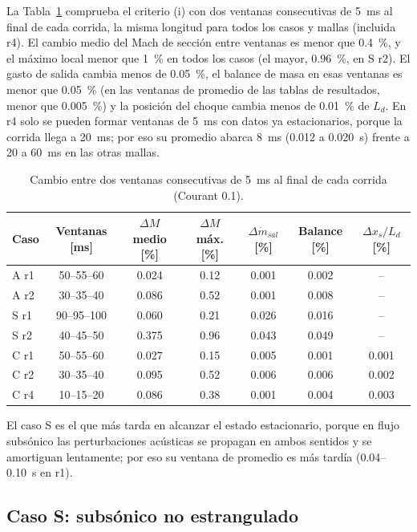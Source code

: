 \documentclass[12pt,letterpaper]{article}
\numberwithin{equation}{section}
\begin{document}
La Tabla~\ref{tab:ventanas-eq} comprueba el criterio (i) con dos ventanas consecutivas de 5~ms al final de cada corrida, la misma longitud para todos los casos y mallas (incluida r4). El cambio medio del Mach de sección entre ventanas es menor que 0.4~\%, y el máximo local menor que 1~\% en todos los casos (el mayor, 0.96~\%, en S r2). El gasto de salida cambia menos de 0.05~\%, el balance de masa en esas ventanas es menor que 0.05~\% (en las ventanas de promedio de las tablas de resultados, menor que 0.005~\%) y la posición del choque cambia menos de 0.01~\% de $L_d$. En r4 solo se pueden formar ventanas de 5~ms con datos ya estacionarios, porque la corrida llega a 20~ms; por eso su promedio abarca 8~ms (0.012 a 0.020~s) frente a 20 a 60~ms en las otras mallas.

\begin{table}[H]
\centering
\caption{Cambio entre dos ventanas consecutivas de 5~ms al final de cada corrida (Courant 0.1).}
\label{tab:ventanas-eq}
\small
\renewcommand{\arraystretch}{1.15}
\begin{tabular}{lcccccc}
\toprule
Caso & Ventanas [ms] & $\Delta M$ medio [\%] & $\Delta M$ máx. [\%] & $\Delta\dot m_{sal}$ [\%] & Balance [\%] & $\Delta x_s/L_d$ [\%] \\
\midrule
A r1 & 50--55--60 & 0.024 & 0.12 & 0.001 & 0.002 & -- \\
A r2 & 30--35--40 & 0.086 & 0.52 & 0.001 & 0.008 & -- \\
S r1 & 90--95--100 & 0.060 & 0.21 & 0.026 & 0.016 & -- \\
S r2 & 40--45--50 & 0.375 & 0.96 & 0.043 & 0.049 & -- \\
C r1 & 50--55--60 & 0.027 & 0.15 & 0.005 & 0.001 & 0.001 \\
C r2 & 30--35--40 & 0.095 & 0.52 & 0.006 & 0.006 & 0.002 \\
C r4 & 10--15--20 & 0.086 & 0.38 & 0.001 & 0.004 & 0.003 \\
\bottomrule
\end{tabular}
\end{table}

El caso S es el que más tarda en alcanzar el estado estacionario, porque en flujo subsónico las perturbaciones acústicas se propagan en ambos sentidos y se amortiguan lentamente; por eso su ventana de promedio es más tardía (0.04--0.10~s en r1).



\subsection{Caso S: subsónico no estrangulado}
\end{document}
